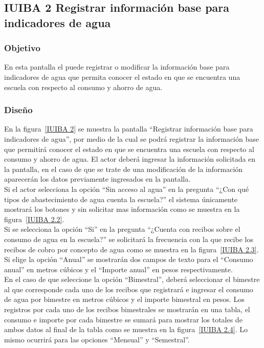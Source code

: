 \subsection{IUIBA 2 Registrar información base para indicadores de agua}

\subsubsection{Objetivo}

      En esta pantalla el  puede registrar o modificar la información base para indicadores de agua que permita conocer el estado en que se encuentra una escuela con respecto al consumo y ahorro de agua.

\subsubsection{Diseño}

    En la figura~\ref{IUIBA 2} se muestra la pantalla ``Registrar información base para indicadores de agua'', por medio de la cual se podrá registrar la información base que permitirá conocer el estado en que se encuentra una escuela con respecto al consumo y ahorro de agua. El actor deberá ingresar la información solicitada en la pantalla, en el caso de que se trate de una modificación de la información aparecerán los datos previamente ingresados en la pantalla.\\
    
    Si el actor selecciona la opción ``Sin acceso al agua'' en la pregunta ``¿Con qué tipos de abastecimiento de agua cuenta la escuela?'' el sistema únicamente mostrará los botones  y  sin solicitar mas información como se muestra en la figura~\ref{IUIBA 2.2}.\\
    
    Si se selecciona la opción ``Si'' en la pregunta ``¿Cuenta con recibos sobre el consumo de agua en la escuela?'' se solicitará la frecuencia con la que recibe los recibos de cobro por concepto de agua como se muestra en la figura~\ref{IUIBA 2.3}. Si elige la opción ``Anual'' se mostrarán dos campos de texto para el ``Consumo anual'' en metros cúbicos y el ``Importe anual'' en pesos respectivamente.\\
    
    En el caso de que seleccione la opción ``Bimestral'', deberá seleccionar el bimestre al que corresponde cada uno de los recibos que registrará e ingresar el consumo de agua por bimestre en metros cúbicos y el importe bimestral en pesos. Los registros por cada uno de los recibos bimestrales se mostrarán en una tabla, el consumo e importe por cada bimestre se sumará para mostrar los totales de ambos datos al final de la tabla como se muestra en la figura~\ref{IUIBA 2.4}. Lo mismo ocurrirá para las opciones ``Mensual'' y ``Semestral''. \\
    
